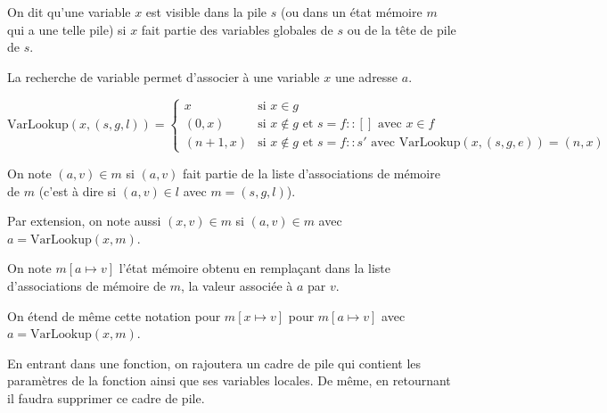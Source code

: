 \begin{definition}[Visibilité]
  On dit qu'une variable $x$ est visible dans la pile $s$ (ou dans un état
  mémoire $m$ qui a une telle pile) si $x$ fait partie des variables globales de
  $s$ ou de la tête de pile de $s$.
\end{definition}

\begin{definition}

  La recherche de variable permet d'associer à une variable $x$ une adresse $a$.

  \[
    \mathrm{VarLookup} (x, (s, g, l)) =
      \begin{cases}
        x      & \mbox{si } x ∈ g \\
      (0, x)   & \mbox{si } x ∉ g \mbox{ et } s = f::[]
                 \mbox{ avec } x ∈ f \\
      (n+1, x) & \mbox{si } x ∉ g \mbox{ et } s = f::s'
                 \mbox{ avec } \mathrm{VarLookup} (x, (s, g, e)) = (n, x)
      \end{cases}
  \]

\end{definition}

\begin{definition}

  On note $(a, v) ∈ m$ si $(a, v)$ fait partie de la liste d'associations de
  mémoire de $m$ (c'est à dire si $(a, v) ∈ l$ avec $m = (s, g, l)$).

  Par extension, on note aussi $(x, v) ∈ m$ si $(a, v) ∈ m$ avec $a =
  \mathrm{VarLookup}(x, m)$.

  On note $m[a ↦ v]$ l'état mémoire obtenu en remplaçant dans la liste
  d'associations de mémoire de $m$, la valeur associée à $a$ par $v$.

  On étend de même cette notation pour $m[x ↦ v]$ pour $m[a ↦ v]$ avec
  $a = \mathrm{VarLookup}(x, m)$.

\end{definition}

En entrant dans une fonction, on rajoutera un cadre de pile qui contient les
paramètres de la fonction ainsi que ses variables locales. De même, en
retournant il faudra supprimer ce cadre de pile.

